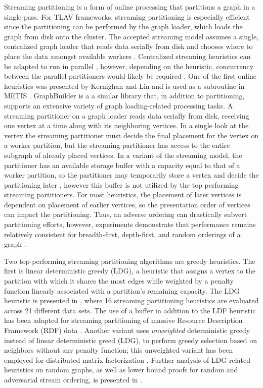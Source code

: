 \documentclass[reprint,twocolumn,showpacs,preprintnumbers,amsmath, aps,pre,amssymb]{revtex4-1}
\begin{document}
Streaming partitioning is a form of online processing that partitions a graph in a single-pass.  For TLAV frameworks, streaming partitioning is especially efficient since the partitioning can be performed by the graph loader, which loads the graph from disk onto the cluster.  The accepted streaming model assumes a single, centralized graph loader that reads data serially from disk and chooses where to place the data amongst available workers \cite{Stanton2012,Tsourakakis2014}.  Centralized streaming heuristics can be adapted to run in parallel \cite{Stanton2012}, however, depending on the heuristic, concurrency between the parallel partitioners would likely be required \cite{Nishimura2013}.  One of the first online heuristics was presented by Kernighan and Lin and is used as a subroutine in METIS \cite{Kernighan1970}.  GraphBuilder \cite{Jain2013} is a a similar library that, in addition to partitioning, supports an extensive variety of graph loading-related processing tasks.  
A streaming partitioner on a graph loader reads data serially from disk, receiving one vertex at a time along with its neighboring vertices.  In a single look at the vertex the streaming partitioner must decide the final placement for the vertex on a worker partition, but the streaming partitioner has access to the entire subgraph of already placed vertices.  In a variant of the streaming model, the partitioner has an available storage buffer with a capacity equal to that of a worker partition, so the partitioner may temporarily store a vertex and decide the partitioning later \cite{Stanton2012}, however this buffer is not utilized by the top performing streaming partitioners.  For most heuristics, the placement of later vertices is dependent on placement of earlier vertices, so the presentation order of vertices can impact the partitioning. Thus, an adverse ordering can drastically subvert partitioning efforts, however, experiments demonstrate that performance remains relatively consistent for breadth-first, depth-first, and random orderings of a graph \cite{Stanton2012,Tsourakakis2014}.

Two top-performing streaming partitioning algorithms are greedy heuristics.  The first is linear deterministic greedy (LDG), a heuristic that assigns a vertex to the partition with which it shares the most edges while weighted by a penalty function linearly associated with a partition's remaining capacity.  The LDG heuristic is presented in \cite{Stanton2012}, where 16 streaming partitioning heuristics are evaluated across 21 different data sets.  The use of a buffer in addition to the LDF heuristic has been adapted for streaming partitioning of massive Resource Description Framework (RDF) data \cite{Wang2013a}. Another variant uses {\em unweighted} deterministic greedy instead of linear deterministic greed (LDG), to perform greedy selection based on neighbors without any penalty function; this unweighted variant has been employed for distributed matrix factorization \cite{Ahmed2013}.  Further analysis of LDG-related heuristics on random graphs, as well as lower bound proofs for random and adversarial stream ordering, is presented in \cite{Stanton2014}.  
\end{document}
